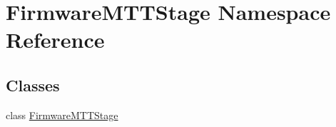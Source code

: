 \hypertarget{namespace_firmware_m_t_t_stage}{\section{Firmware\-M\-T\-T\-Stage Namespace Reference}
\label{namespace_firmware_m_t_t_stage}
}
\subsection*{Classes}
\begin{DoxyCompactItemize}
\item 
class \hyperlink{class_firmware_m_t_t_stage_1_1_firmware_m_t_t_stage}{Firmware\-M\-T\-T\-Stage}
\end{DoxyCompactItemize}
